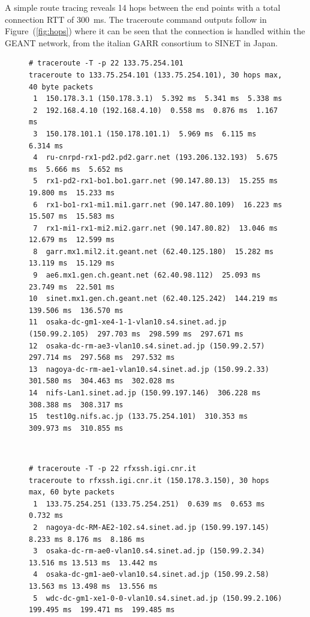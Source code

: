 \documentclass[10pt,a4paper]{article}
\begin{document}
A simple route tracing reveals 14 hops between the end points with a total connection RTT of 300~ms. 
The traceroute command outputs follow in Figure~(\ref{fig:hops}) where it can be seen that the connection is handled within the GEANT network, from the italian GARR consortium to SINET in Japan.

\begin{figure}[htbp!]
\begin{minipage}{.5\textwidth}
{ \tiny \begin{verbatim}
# traceroute -T -p 22 133.75.254.101
traceroute to 133.75.254.101 (133.75.254.101), 30 hops max, 40 byte packets
 1  150.178.3.1 (150.178.3.1)  5.392 ms  5.341 ms  5.338 ms
 2  192.168.4.10 (192.168.4.10)  0.558 ms  0.876 ms  1.167 ms
 3  150.178.101.1 (150.178.101.1)  5.969 ms  6.115 ms  6.314 ms
 4  ru-cnrpd-rx1-pd2.pd2.garr.net (193.206.132.193)  5.675 ms  5.666 ms  5.652 ms
 5  rx1-pd2-rx1-bo1.bo1.garr.net (90.147.80.13)  15.255 ms  19.800 ms  15.233 ms
 6  rx1-bo1-rx1-mi1.mi1.garr.net (90.147.80.109)  16.223 ms  15.507 ms  15.583 ms
 7  rx1-mi1-rx1-mi2.mi2.garr.net (90.147.80.82)  13.046 ms  12.679 ms  12.599 ms
 8  garr.mx1.mil2.it.geant.net (62.40.125.180)  15.282 ms  13.119 ms  15.129 ms
 9  ae6.mx1.gen.ch.geant.net (62.40.98.112)  25.093 ms  23.749 ms  22.501 ms
10  sinet.mx1.gen.ch.geant.net (62.40.125.242)  144.219 ms  139.506 ms  136.570 ms
11  osaka-dc-gm1-xe4-1-1-vlan10.s4.sinet.ad.jp (150.99.2.105)  297.703 ms  298.599 ms  297.671 ms
12  osaka-dc-rm-ae3-vlan10.s4.sinet.ad.jp (150.99.2.57)  297.714 ms  297.568 ms  297.532 ms
13  nagoya-dc-rm-ae1-vlan10.s4.sinet.ad.jp (150.99.2.33)  301.580 ms  304.463 ms  302.028 ms
14  nifs-Lan1.sinet.ad.jp (150.99.197.146)  306.228 ms  308.388 ms  308.317 ms
15  test10g.nifs.ac.jp (133.75.254.101)  310.353 ms  309.973 ms  310.855 ms
\end{verbatim} }
\end{minipage} 
~
\begin{minipage}{.5\textwidth}
{ \tiny \begin{verbatim}
# traceroute -T -p 22 rfxssh.igi.cnr.it
traceroute to rfxssh.igi.cnr.it (150.178.3.150), 30 hops max, 60 byte packets
 1  133.75.254.251 (133.75.254.251)  0.639 ms  0.653 ms  0.732 ms
 2  nagoya-dc-RM-AE2-102.s4.sinet.ad.jp (150.99.197.145)  8.233 ms 8.176 ms  8.186 ms
 3  osaka-dc-rm-ae0-vlan10.s4.sinet.ad.jp (150.99.2.34)  13.516 ms 13.513 ms  13.442 ms
 4  osaka-dc-gm1-ae0-vlan10.s4.sinet.ad.jp (150.99.2.58)  13.563 ms 13.498 ms  13.556 ms
 5  wdc-dc-gm1-xe1-0-0-vlan10.s4.sinet.ad.jp (150.99.2.106)  199.495 ms  199.471 ms  199.485 ms

\end{verbatim}}
\end{minipage}
\end{figure}
\end{document}
